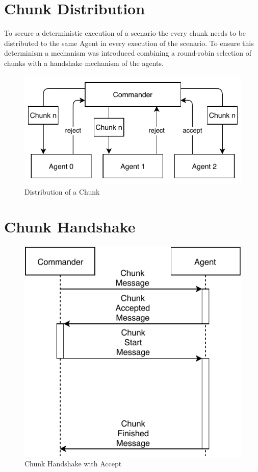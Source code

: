\section{Chunk Distribution}
To secure a deterministic execution of a scenario the every chunk needs to be distributed to the same Agent in every execution of the scenario.
To ensure this determinism a mechanism was introduced combining a round-robin selection of chunks with a handshake mechanism of the agents.
\begin{figure}[h]
	\begin{center}
	\includegraphics[scale=1]{Resources/PDF/ChunkDistribution}
	\caption{Distribution of a Chunk}
	\label{pic:ChunkDistribution}
	\end{center}
\end{figure}

\section{Chunk Handshake}
\begin{figure}[h]
	\begin{center}
	\includegraphics[scale=1]{Resources/PDF/ChunkAcceptedHandshake}
	\caption{Chunk Handshake with Accept}
	\label{pic:ChunkAcceptedHandshake}
	\end{center}
\end{figure}

